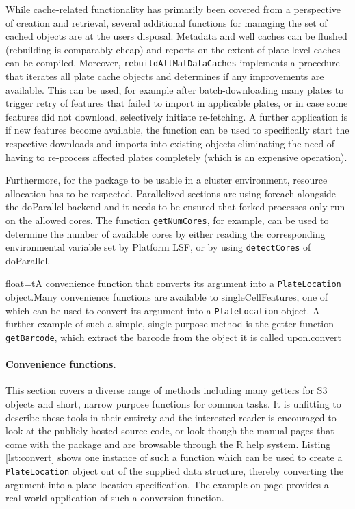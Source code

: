 While cache-related functionality has primarily been covered from a perspective of creation and retrieval, several additional functions for managing the set of cached objects are at the users disposal. Metadata and well caches can be flushed (rebuilding is comparably cheap) and reports on the extent of plate level caches can be compiled. Moreover, \texttt{rebuildAllMatDataCaches} implements a procedure that iterates all plate cache objects and determines if any improvements are available. This can be used, for example after batch-downloading many plates to trigger retry of features that failed to import in applicable plates, or in case some features did not download, selectively initiate re-fetching. A further application is if new features become available, the function can be used to specifically start the respective downloads and imports into existing objects eliminating the need of having to re-process affected plates completely (which is an expensive operation).

Furthermore, for the package to be usable in a cluster environment, resource allocation has to be respected. Parallelized sections are using foreach \citep{Weston2014} alongside the doParallel backend \citep{Weston2014a} and it needs to be ensured that forked processes only run on the allowed cores. The function \texttt{getNumCores}, for example, can be used to determine the number of available cores by either reading the corresponding environmental variable set by Platform LSF, or by using \texttt{detectCores} of doParallel.

\begin{rlisting}{float=t}{A convenience function that converts its argument into a \texttt{PlateLocation} object.}{Many convenience functions are available to singleCellFeatures, one of which can be used to convert its argument into a \texttt{PlateLocation} object. A further example of such a simple, single purpose method is the getter function \texttt{getBarcode}, which extract the barcode from the object it is called upon.}{convert}

\end{rlisting}

\paragraph{Convenience functions.}
This section covers a diverse range of methods including many getters for S3 objects and short, narrow purpose functions for common tasks. It is unfitting to describe these tools in their entirety and the interested reader is encouraged to look at the publicly hosted source code, or look though the manual pages that come with the package and are browsable through the R help system. Listing \ref{lst:convert} shows one instance of such a function which can be used to create a \texttt{PlateLocation} object out of the supplied data structure, thereby converting the argument into a plate location specification. The example on page \pageref{ex:dataobject-instantiation} provides a real-world application of such a conversion function.


